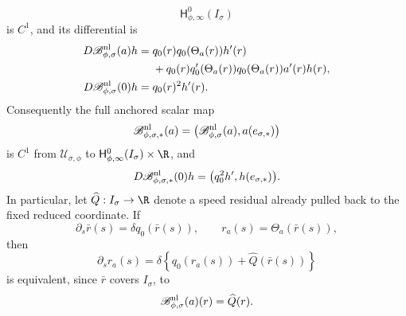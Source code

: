 \begin{lemma}
\[             \mathsf H_{\phi,\infty}^0(I_\sigma)
\]
is \(C^1\), and its differential is
\begin{align}
 D\mathscr B_{\phi,\sigma}^{\rm nl}(a)h
 ={}&q_0(r)q_0(\Theta_a(r))h'(r)\notag\\
 &+q_0(r)q_0'(\Theta_a(r))q_0(\Theta_a(r))
             a'(r)h(r),                            \label{eq:anchored-nonlinear-phase-action-derivative}\\
 D\mathscr B_{\phi,\sigma}^{\rm nl}(0)h
 ={}&q_0(r)^2h'(r).                                \label{eq:anchored-nonlinear-phase-linearization}
\end{align}
Consequently the full anchored scalar map
\begin{equation}
 \mathscr B_{\phi,\sigma,*}^{\rm nl}(a)
 =\bigl(\mathscr B_{\phi,\sigma}^{\rm nl}(a),
             a(e_{\sigma,*})\bigr)                 \label{eq:anchored-nonlinear-phase-full-map}
\end{equation}
is \(C^1\) from \(\mathcal U_{\sigma,\phi}\) to
\(\mathsf H_{\phi,\infty}^0(I_\sigma)\times\R\), and
\begin{equation}
 D\mathscr B_{\phi,\sigma,*}^{\rm nl}(0)h
 =\bigl(q_0^2h',h(e_{\sigma,*})\bigr).             \label{eq:anchored-nonlinear-full-linearization}
\end{equation}
In particular, let \(\widehat Q:I_\sigma\to\R\) denote a speed
residual already pulled back to the fixed reduced coordinate.  If
\[
 \partial_s\bar r(s)=\delta q_0(\bar r(s)),
 \qquad
 r_a(s)=\Theta_a(\bar r(s)),
\]
then
\[
 \partial_sr_a(s)
 =\delta\left\{q_0(r_a(s))
          +\widehat Q(\bar r(s))\right\}
\]
is equivalent, since \(\bar r\) covers \(I_\sigma\), to
\begin{equation}
 \mathscr B_{\phi,\sigma}^{\rm nl}(a)(r)
 =\widehat Q(r).                                   \label{eq:anchored-nonlinear-phase-equation}
\end{equation}


\end{lemma}

